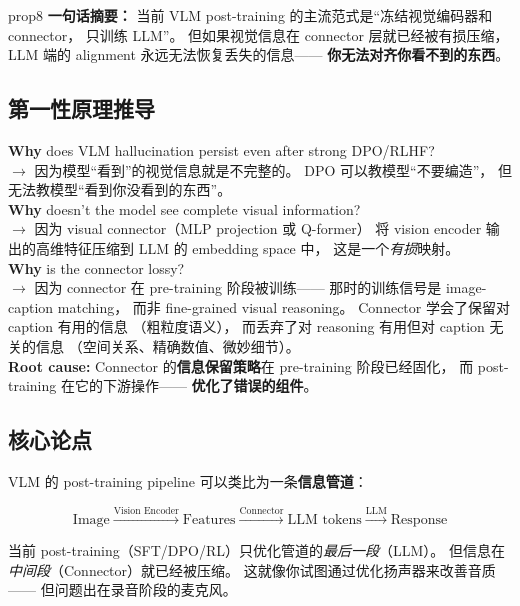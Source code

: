 \documentclass[12pt,a4paper]{article}
\begin{document}
\begin{proposalbox}{prop8}
\textbf{一句话摘要：}
当前 VLM post-training 的主流范式是``冻结视觉编码器和 connector，
只训练 LLM''。
但如果视觉信息在 connector 层就已经被有损压缩，
LLM 端的 alignment 永远无法恢复丢失的信息——
\textbf{你无法对齐你看不到的东西}。
\end{proposalbox}

\subsection{第一性原理推导}

\begin{whybox}
\textbf{Why} does VLM hallucination persist even after strong DPO/RLHF?\\
$\rightarrow$ 因为模型``看到''的视觉信息就是不完整的。
DPO 可以教模型``不要编造''，
但无法教模型``看到你没看到的东西''。\\[3pt]
\textbf{Why} doesn't the model see complete visual information?\\
$\rightarrow$ 因为 visual connector（MLP projection 或 Q-former）
将 vision encoder 输出的高维特征压缩到 LLM 的 embedding space 中，
这是一个\textit{有损}映射。\\[3pt]
\textbf{Why} is the connector lossy?\\
$\rightarrow$ 因为 connector 在 pre-training 阶段被训练——
那时的训练信号是 image-caption matching，
而非 fine-grained visual reasoning。
Connector 学会了保留对 caption 有用的信息
（粗粒度语义），
而丢弃了对 reasoning 有用但对 caption 无关的信息
（空间关系、精确数值、微妙细节）。\\[3pt]
\textbf{Root cause:}
Connector 的\textbf{信息保留策略}在 pre-training 阶段已经固化，
而 post-training 在它的下游操作——
\textbf{优化了错误的组件}。
\end{whybox}

\subsection{核心论点}

\begin{insightbox}
VLM 的 post-training pipeline 可以类比为一条\textbf{信息管道}：

$$\text{Image} \xrightarrow{\text{Vision Encoder}} \text{Features}
\xrightarrow{\text{Connector}} \text{LLM tokens}
\xrightarrow{\text{LLM}} \text{Response}$$

当前 post-training（SFT/DPO/RL）只优化管道的\textit{最后一段}（LLM）。
但信息在\textit{中间段}（Connector）就已经被压缩。
这就像你试图通过优化扬声器来改善音质——
但问题出在录音阶段的麦克风。
\end{insightbox}
\end{document}
